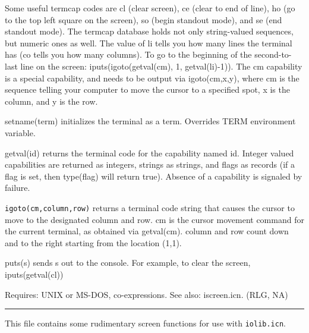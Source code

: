 Some useful termcap codes are {\textquotedbl}cl{\textquotedbl} (clear
screen), {\textquotedbl}ce{\textquotedbl} (clear to end of line),
{\textquotedbl}ho{\textquotedbl} (go to the top left square on the
screen), {\textquotedbl}so{\textquotedbl} (begin standout mode), and
{\textquotedbl}se{\textquotedbl} (end standout mode). The termcap
database holds not only string-valued sequences, but numeric ones as
well. The value of {\textquotedbl}li{\textquotedbl} tells you how many
lines the terminal has ({\textquotedbl}co{\textquotedbl} tells you how
many columns). To go to the beginning of the second-to-last line on the
screen: iputs(igoto(getval({\textquotedbl}cm{\textquotedbl}), 1,
getval({\textquotedbl}li{\textquotedbl})-1)). The
{\textquotedbl}cm{\textquotedbl} capability is a special capability,
and needs to be output via igoto(cm,x,y), where cm is the sequence
telling your computer to move the cursor to a specified spot, x is the
column, and y is the row.

\textsf{setname(term)} initializes the terminal as a term. Overrides
TERM environment variable.

\textsf{getval(id)} returns the terminal code for the capability named
id. Integer valued capabilities are returned as integers, strings as
strings, and flags as records (if a flag is set, then
\textsf{type(flag)} will return
\textsf{{\textquotedbl}true{\textquotedbl}}). Absence of a capability
is signaled by failure.

\texttt{igoto(cm,column,row)} returns a terminal code string that causes
the cursor to move to the designated column and row. cm is the cursor
movement command for the current terminal, as obtained via
getval({\textquotedbl}cm{\textquotedbl}). column and row count down and
to the right starting from the location (1,1).

\textsf{puts(s)} sends s out to the console. For example, to clear the
screen, \textsf{iputs(getval({\textquotedbl}cl{\textquotedbl}))}

Requires: UNIX or MS-DOS, co-expressions. See also: iscreen.icn. (RLG,
NA)

\vspace{0.25cm}\hrule{}

This file contains some rudimentary screen functions for use with
\texttt{iolib.icn}.

